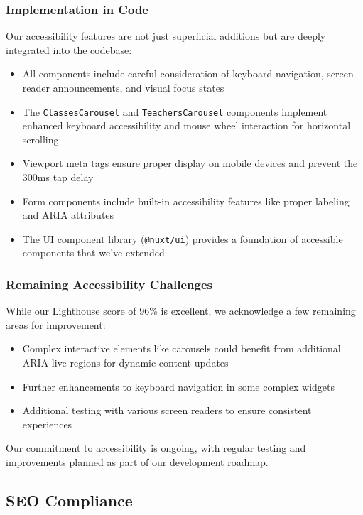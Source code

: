 \subsubsection{Implementation in Code}

Our accessibility features are not just superficial additions but are deeply integrated into the codebase:

\begin{itemize}
    \item All components include careful consideration of keyboard navigation, screen reader announcements, and visual focus states
    \item The \texttt{ClassesCarousel} and \texttt{TeachersCarousel} components implement enhanced keyboard accessibility and mouse wheel interaction for horizontal scrolling
    \item Viewport meta tags ensure proper display on mobile devices and prevent the 300ms tap delay
    \item Form components include built-in accessibility features like proper labeling and ARIA attributes
    \item The UI component library (\texttt{@nuxt/ui}) provides a foundation of accessible components that we've extended
\end{itemize}

\subsubsection{Remaining Accessibility Challenges}

While our Lighthouse score of 96\% is excellent, we acknowledge a few remaining areas for improvement:

\begin{itemize}
    \item Complex interactive elements like carousels could benefit from additional ARIA live regions for dynamic content updates
    \item Further enhancements to keyboard navigation in some complex widgets
    \item Additional testing with various screen readers to ensure consistent experiences
\end{itemize}

Our commitment to accessibility is ongoing, with regular testing and improvements planned as part of our development roadmap.

\subsection{SEO Compliance}

